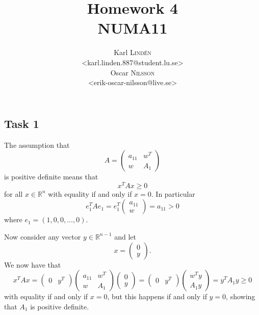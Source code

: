 \documentclass[a4paper,12pt]{article}
\begin{document}
\title{Homework 4 \\ NUMA11}
\author{
  Karl \textsc{Lind\'{e}n} \\
  <karl.linden.887@student.lu.se> \\
  Oscar \textsc{Nilsson} \\
  <erik-oscar-nilsson@live.se>
}

\maketitle
\thispagestyle{empty}

\newpage


\subsection*{Task 1}

The assumption that
\[
  A = \begin{pmatrix}
    a_{11} & w^T \\
    w      & A_1
  \end{pmatrix}
\]
is positive definite means that
\[ x^T A x \ge 0 \]
for all \(x \in \mathbb{R}^n\) with equality if and only if \(x = 0\).
In particular
\[
  e_1^T A e_1
    = e_1^T
      \begin{pmatrix}
        a_{11} \\
        w
      \end{pmatrix}
    = a_{11}
    > 0
\]
where \(e_1 = (1,0,0,\dots,0)\).

Now consider any vector \(y \in \mathbb{R}^{n-1}\) and let
\[
  x = \begin{pmatrix}
    0 \\
    y
  \end{pmatrix}.
\]
We now have that
\[
  x^T A x
    =
      \begin{pmatrix}
        0 & y^T
      \end{pmatrix}
      \begin{pmatrix}
        a_{11} & w^T \\
        w      & A_1
      \end{pmatrix}
      \begin{pmatrix}
        0 \\
        y
      \end{pmatrix}
    =
      \begin{pmatrix}
        0 & y^T
      \end{pmatrix}
      \begin{pmatrix}
        w^T y \\
        A_1 y
      \end{pmatrix}
    = y^T A_1 y
    \ge 0
\]
with equality if and only if \(x = 0\), but this happens if and only if
\(y = 0\), showing that \(A_1\) is positive definite.
\end{document}
